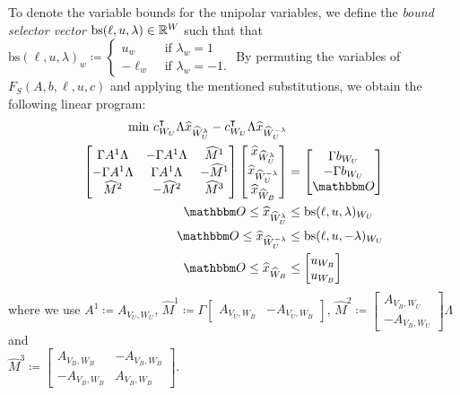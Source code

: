 \documentclass[pdflatex,sn-mathphys-num]{sn-jnl}%
\theoremstyle{thmstyleone}%
\theoremstyle{thmstylethree}%
\theoremstyle{thmstyletwo}%
\begin{document}
To denote the variable bounds for the unipolar variables, we define the \emph{bound selector vector} $\mathrm{bs}(\ell,u,\lambda)\in \mathbb{R}^{W}$ such that that $\mathrm{bs}(\ell,u,\lambda)_w \coloneqq \begin{cases}
    u_w &\text{ if $\lambda_w = 1$ }\\
    -\ell_w &\text{ if $\lambda_w = -1$.}
\end{cases}$
By permuting the variables of $F_S(A,b,\ell,u,c)$ and applying the mentioned substitutions, we obtain the following linear program:
\begin{subequations}
\label{lp_centered_extended_reordered}
\begin{align}
    \min\, \transpose{c_{W_U}} \Lambda \widehat{x}_{\widehat{W}^\lambda_U} - \transpose{c_{W_U}} \Lambda \widehat{x}_{\widehat{W}^{-\lambda}_U} & \\
\begin{bmatrix}
    \Gamma A^1 \Lambda & -\Gamma A^1 \Lambda & \widehat{M}^1
    \\
    -\Gamma A^1 \Lambda & \Gamma A^1 \Lambda & -\widehat{M}^1
    \\
    \widehat{M}^2 & -\widehat{M}^2 & \widehat{M}^3 \\
\end{bmatrix}
\begin{bmatrix}
    \widehat{x}_{\widehat{W}^\lambda_U}\\
    \widehat{x}_{\widehat{W}^{-\lambda}_U}\\
    \widehat{x}_{\widehat{W}_B}
\end{bmatrix} &= \begin{bmatrix}
    \Gamma b_{W_U}\\
    -\Gamma b_{W_U}\\
    \zerovec
\end{bmatrix}\\
\zerovec \leq \widehat{x}_{\widehat{W}^\lambda_U} &\leq \mathrm{bs}(\ell,u,\lambda)_{W_U} \\
\zerovec \leq \widehat{x}_{\widehat{W}^{-\lambda}_U} &\leq \mathrm{bs}(\ell,u,-\lambda)_{W_U} \\
\zerovec \leq \widehat{x}_{\widehat{W}_B} &\leq \begin{bmatrix}
    u_{W_B}\\
    u_{W_B}
\end{bmatrix} 
\end{align}    
\end{subequations}
where we use $A^1 \coloneqq A_{V_U,W_U}$, $\widehat{M}^1 \coloneqq \Gamma \begin{bmatrix}
    A_{V_U,W_B} & -A_{V_U,W_B}
\end{bmatrix}$, $\widehat{M}^2 \coloneqq \begin{bmatrix}
    A_{V_B,W_U}\\
    -A_{V_B,W_U}
\end{bmatrix} \Lambda$ and\\ $\widehat{M}^3 \coloneqq \begin{bmatrix}
    A_{V_B,W_B} & - A_{V_B,W_B}\\
    -A_{V_B,W_B} & A_{V_B,W_B}
\end{bmatrix}$.
\end{document}
